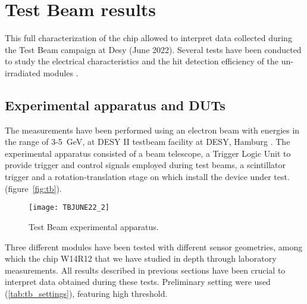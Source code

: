 \section{Test Beam results}

This full characterization of the chip allowed to interpret data collected during the Test Beam campaign at Desy (June 2022). Several tests have been conducted to study the electrical characteristics and the hit detection efficiency of the un-irradiated modules \cite{Bespin:2023vyw}.



\subsection{Experimental apparatus and DUTs }

The measurements have been performed using an electron beam with energies in the range of 3-\SI{5}{GeV}, at DESY II testbeam facility at DESY, Hamburg \cite{Diener:2018qap}. The experimental apparatus consisted of a beam telescope, a Trigger Logic Unit to provide trigger and control signals employed during test beams, a scintillator trigger and a rotation-translation stage on which install the device under test. (figure~\autoref{fig:tb}).

\begin{figure}[h!]
\centering
\texttt{[image: TBJUNE22\_2]}
\caption{Test Beam experimental apparatus.}
\label{fig:tb}
\end{figure}



\begin{comment}
\begin{figure}[h!]
\centering
\subfigure[Test beam apparatus.]
{\texttt{[image: TBJUNE22\_PHOTO]}}\quad
\subfigure[Test beam schematics.]
{\texttt{[image: TBJUNE22]}}\\
\caption{Test Beam setting at DESY.}
\label{fig:tb}
\end{figure}
\end{comment}

Three different modules have been tested with different sensor geometries, among which the chip W14R12 that we have studied in depth through laboratory measurements. All results described in previous sections have been crucial to interpret data obtained during these tests. Preliminary setting were used (\autoref{tab:tb_settings}), featuring high threshold.

